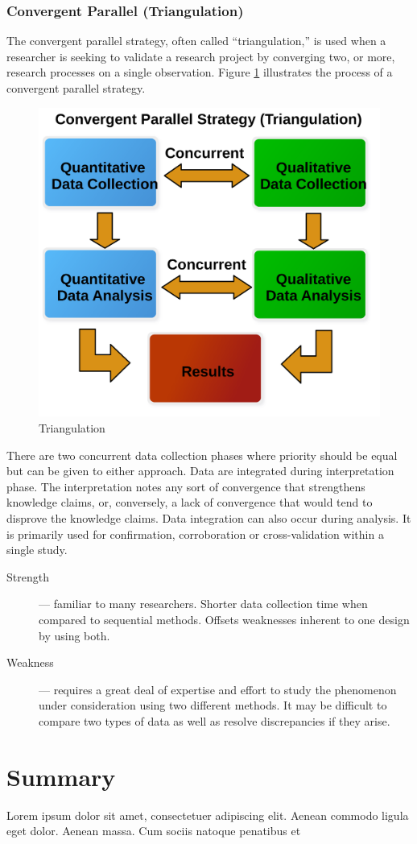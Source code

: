 \subsubsection{Convergent Parallel (Triangulation)}

The convergent parallel strategy, often called ``triangulation,'' is used when a researcher is seeking to validate a research project by converging two, or more, research processes on a single observation. Figure \ref{14:fig92} illustrates the process of a convergent parallel strategy. 

\begin{figure}[H]
	\centering
	\includegraphics[width=\maxwidth{.95\linewidth}]{gfx/14-Triangulation}
	\caption{Triangulation}
	\label{14:fig92}
\end{figure}

There are two concurrent data collection phases where priority should be equal but can be given to either approach. Data are integrated during interpretation phase. The interpretation notes any sort of convergence that strengthens knowledge claims, or, conversely, a lack of convergence that would tend to disprove the knowledge claims. Data integration can also occur during analysis. It is primarily used for confirmation, corroboration or cross-validation within a single study.

\begin{description}
	\item[Strength] --- familiar to many researchers. Shorter data collection time when compared to sequential methods. Offsets weaknesses inherent to one design by using both.
	\item[Weakness] --- requires a great deal of expertise and effort to study the phenomenon under consideration using two different methods. It may be difficult to compare two types of data as well as resolve discrepancies if they arise.
\end{description}


\section{Summary}\label{ch14:summary}

Lorem ipsum dolor sit amet, consectetuer adipiscing elit. Aenean commodo ligula eget dolor. Aenean massa. Cum sociis natoque penatibus et
